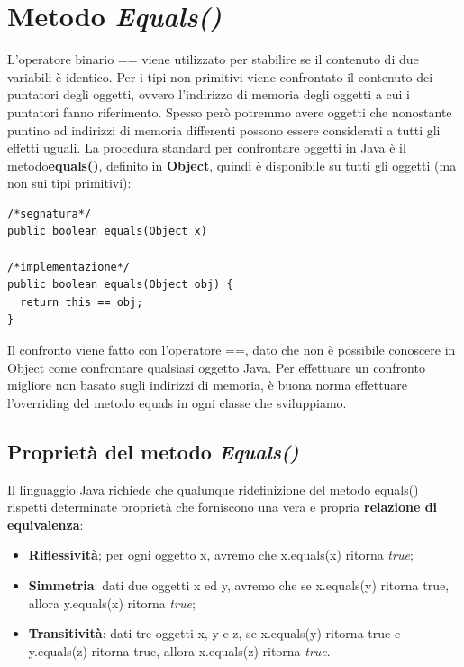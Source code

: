 \section{Metodo \textit{Equals()}}
L’operatore binario == viene utilizzato per stabilire se il contenuto di due variabili è identico. Per i tipi non primitivi viene confrontato il contenuto dei puntatori degli oggetti, ovvero l’indirizzo di memoria degli oggetti a cui i puntatori fanno riferimento.
Spesso però potremmo avere oggetti che nonostante puntino ad indirizzi di memoria differenti possono essere considerati a tutti gli effetti uguali.
La procedura standard per confrontare oggetti in Java è il metodo\textbf{equals()}, definito in \textbf{Object}, quindi è disponibile su tutti gli oggetti (ma non sui tipi primitivi):
\begin{lstlisting}
/*segnatura*/
public boolean equals(Object x)

/*implementazione*/
public boolean equals(Object obj) {
  return this == obj;
}

\end{lstlisting}
Il confronto viene fatto con l’operatore ==, dato che non è possibile conoscere in Object come confrontare qualsiasi oggetto Java.  Per effettuare un confronto migliore non basato sugli indirizzi di memoria, è buona norma effettuare l’overriding del metodo equals in ogni classe che sviluppiamo.

\subsection{Proprietà del metodo \textit{Equals()}}
Il linguaggio Java richiede che qualunque ridefinizione del metodo equals() rispetti determinate proprietà che forniscono una vera e propria \textbf{relazione di equivalenza}:
\begin{itemize}
\item \textbf{Riflessività}; per ogni oggetto x, avremo che x.equals(x) ritorna \textit{true};
\item \textbf{Simmetria}: dati due oggetti x ed y, avremo che se x.equals(y) ritorna true, allora y.equals(x) ritorna \textit{true};
\item \textbf{Transitività}: dati tre oggetti x, y e z, se x.equals(y) ritorna true e y.equals(z) ritorna true, allora x.equals(z) ritorna \textit{true}.
\end{itemize}

